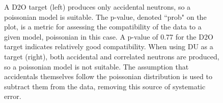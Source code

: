 \begin{figure}[htbp]
    \centering
    \caption{A D2O target (left) produces only accidental neutrons, so a poissonian model is suitable.
    The p-value, denoted ``prob" on the plot, is a metric for assessing the compatibility of the data to a given model, poissonian in this case.
    A p-value of 0.77 for the D2O target indicates relatively good compatibility.
    When using DU as a target (right), both accidental and correlated neutrons are produced, so a poissonian model is not suitable.
    The assumption that accidentals themselves follow the poissonian distribution is used to subtract them from the data, removing this source of systematic error.}
    \label{fig:PoissonianFits}
\end{figure}
